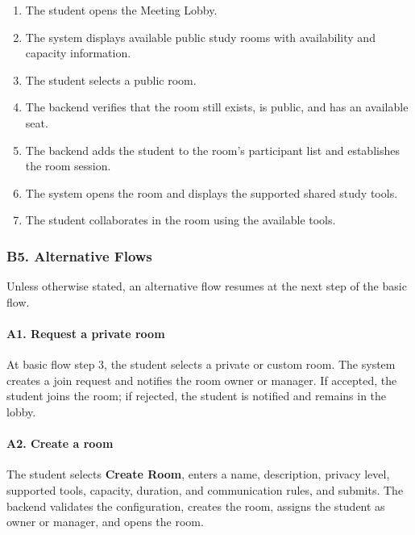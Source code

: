 \documentclass[12pt]{article}
\begin{document}
\begin{enumerate}
\item The student opens the Meeting Lobby.
\item The system displays available public study rooms with availability and capacity information.
\item The student selects a public room.
\item The backend verifies that the room still exists, is public, and has an available seat.
\item The backend adds the student to the room's participant list and establishes the room session.
\item The system opens the room and displays the supported shared study tools.
\item The student collaborates in the room using the available tools.
\end{enumerate}
\par\medskip

\hypertarget{sec:b5-alternative-flows}{}
\subsubsection*{B5. Alternative Flows}
\par\medskip

Unless otherwise stated, an alternative flow resumes at the next step of the basic flow.
\par\medskip

\hypertarget{sec:a1-request-a-private-room}{}
\paragraph*{A1. Request a private room}
\par\medskip

At basic flow step 3, the student selects a private or custom room. The system creates a join request and notifies the room owner or manager. If accepted, the student joins the room; if rejected, the student is notified and remains in the lobby.
\par\medskip

\hypertarget{sec:a2-create-a-room}{}
\paragraph*{A2. Create a room}
\par\medskip

The student selects \textbf{Create Room}, enters a name, description, privacy level, supported tools, capacity, duration, and communication rules, and submits. The backend validates the configuration, creates the room, assigns the student as owner or manager, and opens the room.
\par\medskip
\end{document}
